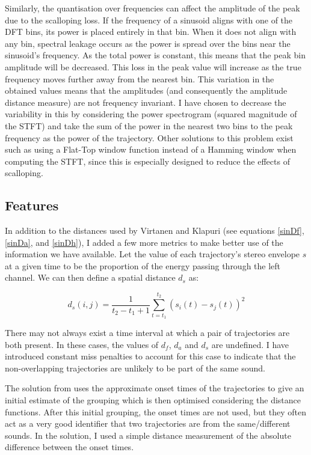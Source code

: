 \documentclass[12pt,a4paper,twoside,openright]{report}
\begin{document}
Similarly, the quantisation over frequencies can affect the amplitude of the peak due to the scalloping loss. If the frequency of a sinusoid aligns with one of the DFT bins, its power is placed entirely in that bin. When it does not align with any bin, spectral leakage occurs as the power is spread over the bins near the sinusoid's frequency. As the total power is constant, this means that the peak bin amplitude will be decreased. This loss in the peak value will increase as the true frequency moves further away from the nearest bin. This variation in the obtained values means that the amplitudes (and consequently the amplitude distance measure) are not frequency invariant. I have chosen to decrease the variability in this by considering the power spectrogram (squared magnitude of the STFT) and take the sum of the power in the nearest two bins to the peak frequency as the power of the trajectory. Other solutions to this problem exist such as using a Flat-Top window function instead of a Hamming window when computing the STFT, since this is especially designed to reduce the effects of scalloping.

\subsection{Features}

In addition to the distances used by Virtanen and Klapuri (see equations \ref{sinDf}, \ref{sinDa}, and \ref{sinDh}), I added a few more metrics to make better use of the information we have available. Let the value of each trajectory's stereo envelope $ s $ at a given time to be the proportion of the energy passing through the left channel. We can then define a spatial distance $ d_s $ as:

\begin{equation}
d_s(i,j) = \frac{1}{t_2 - t_1 + 1} \sum_{t = t_1}^{t_2} \left( s_i(t) - s_j(t) \right)^2
\end{equation}

There may not always exist a time interval at which a pair of trajectories are both present. In these cases, the values of $ d_f $, $ d_a $ and $ d_s $ are undefined. I have introduced constant miss penalties to account for this case to indicate that the non-overlapping trajectories are unlikely to be part of the same sound.

The solution from \cite{virtanen2000separation} uses the approximate onset times of the trajectories to give an initial estimate of the grouping which is then optimised considering the distance functions. After this initial grouping, the onset times are not used, but they often act as a very good identifier that two trajectories are from the same/different sounds. In the solution, I used a simple distance measurement of the absolute difference between the onset times.
\end{document}
